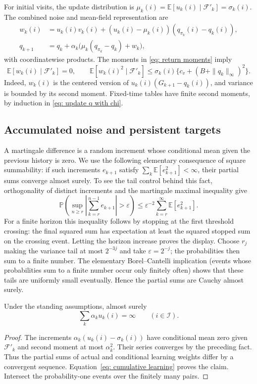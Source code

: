 For initial visits, the update distribution is $\mu_k(i)=\mathbb E[u_k(i)\mid\mathcal F'_k]=\sigma_k(i)$. The combined noise and mean-field representation are
\begin{align}
 w_k(i)&=u_k(i)v_k(i)+(u_k(i)-\mu_k(i))(q_{\pi_k}(i)-q_k(i)),\label{eq: definition combined noise}\\
 q_{k+1}&=q_k+\alpha_k\bigl(\mu_k(q_{\pi_k}-q_k)+w_k\bigr),\label{eq: mcopi sa}
\end{align}
with coordinatewise products. The moments in \eqref{eq: return moments} imply
\begin{equation}\label{eq: combined moments}
\mathbb E[w_k(i)\mid\mathcal F'_k]=0,\qquad
\mathbb E[w_k(i)^2\mid\mathcal F'_k]\le\sigma_k(i)\{c_v+(B+\|q_k\|_\infty)^2\}.
\end{equation}
Indeed, $w_k(i)$ is the centered version of $u_k(i)(G_{k+1}-q_k(i))$, and variance is bounded by its second moment. Fixed-time tables have finite second moments, by induction in \eqref{eq: update q with chi}.

\subsection{Accumulated noise and persistent targets}
A martingale difference is a random increment whose conditional mean given the previous history is zero. We use the following elementary consequence of square summability: if such increments $e_{k+1}$ satisfy $\sum_k\mathbb E[e_{k+1}^2]<\infty$, their partial sums converge almost surely. To see the tail control behind this fact, orthogonality of distinct increments and the martingale maximal inequality give
\[
\mathbb P\left(\sup_{n\ge r}\left|\sum_{k=r}^{n-1}e_{k+1}\right|>\varepsilon\right)
\le\varepsilon^{-2}\sum_{k=r}^\infty\mathbb E[e_{k+1}^2].
\]
For a finite horizon this inequality follows by stopping at the first threshold crossing: the final squared sum has expectation at least the squared stopped sum on the crossing event. Letting the horizon increase proves the display. Choose $r_j$ making the variance tail at most $2^{-3j}$ and take $\varepsilon=2^{-j}$; the probabilities then sum to a finite number. The elementary Borel--Cantelli implication (events whose probabilities sum to a finite number occur only finitely often) shows that these tails are uniformly small eventually. Hence the partial sums are Cauchy almost surely.

\begin{lemma}\label{lem: actual learning}
Under the standing assumptions, almost surely
\[
\sum_k\alpha_k u_k(i)=\infty\qquad(i\in\mathcal I).
\]
\end{lemma}
\begin{proof}
The increments $\alpha_k(u_k(i)-\sigma_k(i))$ have conditional mean zero given $\mathcal F'_k$ and second moment at most $\alpha_k^2$. Their series converges by the preceding fact. Thus the partial sums of actual and conditional learning weights differ by a convergent sequence. Equation~\eqref{eq: cumulative learning} proves the claim. Intersect the probability-one events over the finitely many pairs.
\end{proof}

